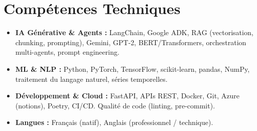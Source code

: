 \documentclass[a4paper,11pt]{article}
\begin{document}
\section{Compétences Techniques}
\begin{itemize}[leftmargin=*, nosep]
    \item \small{\textbf{IA Générative \& Agents :} LangChain, Google ADK, RAG (vectorisation, chunking, prompting), Gemini, GPT-2, BERT/Transformers, orchestration multi-agents, prompt engineering.}
    \item \small{\textbf{ML \& NLP :} Python, PyTorch, TensorFlow, scikit-learn, pandas, NumPy, traitement du langage naturel, séries temporelles.}
    \item \small{\textbf{Développement \& Cloud :} FastAPI, APIs REST, Docker, Git, Azure (notions), Poetry, CI/CD. Qualité de code (linting, pre-commit).}
    \item \small{\textbf{Langues :} Français (natif), Anglais (professionnel / technique).}
\end{itemize}

\end{document}
